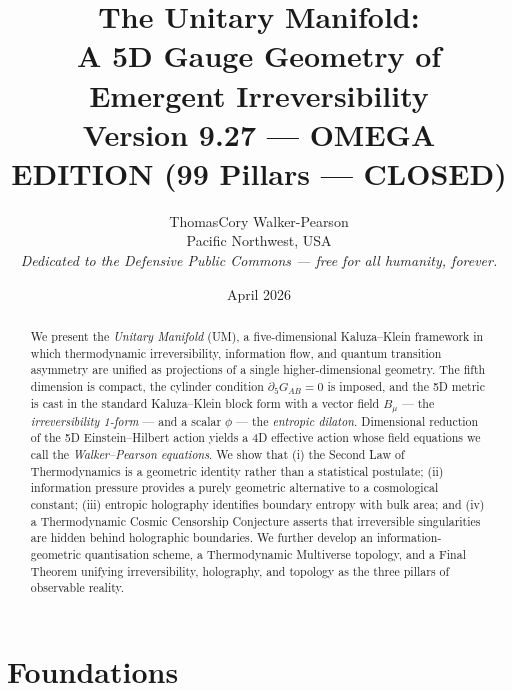 \documentclass[12pt,a4paper]{article}
\begin{document}
\title{\textbf{The Unitary Manifold:}\\
A 5D Gauge Geometry of Emergent Irreversibility\\[4pt]
{\large Version 9.27 — OMEGA EDITION (99 Pillars — CLOSED)}}

\author{ThomasCory Walker-Pearson\\[4pt]
\small Pacific Northwest, USA\\[2pt]
\small \textit{Dedicated to the Defensive Public Commons — free for all humanity, forever.}}

\date{April 2026}
\maketitle

\begin{abstract}
We present the \emph{Unitary Manifold} (UM), a five-dimensional Kaluza--Klein
framework in which thermodynamic irreversibility, information flow, and quantum
transition asymmetry are unified as projections of a single higher-dimensional
geometry.  The fifth dimension is compact, the cylinder condition
$\partial_5 G_{AB}=0$ is imposed, and the 5D metric is cast in the standard
Kaluza--Klein block form with a vector field $B_\mu$ — the \emph{irreversibility
1-form} — and a scalar $\phi$ — the \emph{entropic dilaton}.  Dimensional
reduction of the 5D Einstein--Hilbert action yields a 4D effective action
whose field equations we call the \emph{Walker--Pearson equations}.  We show
that (i) the Second Law of Thermodynamics is a geometric identity rather than a
statistical postulate; (ii) information pressure provides a purely geometric
alternative to a cosmological constant; (iii) entropic holography identifies
boundary entropy with bulk area; and (iv) a Thermodynamic Cosmic Censorship
Conjecture asserts that irreversible singularities are hidden behind holographic
boundaries.  We further develop an information-geometric quantisation scheme, a
Thermodynamic Multiverse topology, and a Final Theorem unifying irreversibility,
holography, and topology as the three pillars of observable reality.
\end{abstract}

\tableofcontents
\newpage

\part{Foundations}
\end{document}
